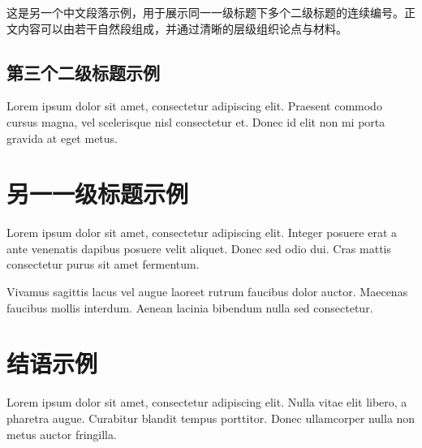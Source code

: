 \documentclass[BAhumanities,customization]{main}
\begin{document}
这是另一个中文段落示例，用于展示同一一级标题下多个二级标题的连续编号。正文内容可以由若干自然段组成，并通过清晰的层级组织论点与材料。

\subsection{第三个二级标题示例}

Lorem ipsum dolor sit amet, consectetur adipiscing elit. Praesent commodo cursus magna, vel scelerisque nisl consectetur et. Donec id elit non mi porta gravida at eget metus.

\section{另一一级标题示例}

Lorem ipsum dolor sit amet, consectetur adipiscing elit. Integer posuere erat a ante venenatis dapibus posuere velit aliquet. Donec sed odio dui. Cras mattis consectetur purus sit amet fermentum.

Vivamus sagittis lacus vel augue laoreet rutrum faucibus dolor auctor. Maecenas faucibus mollis interdum. Aenean lacinia bibendum nulla sed consectetur.

\section*{结语示例}

Lorem ipsum dolor sit amet, consectetur adipiscing elit. Nulla vitae elit libero, a pharetra augue. Curabitur blandit tempus porttitor. Donec ullamcorper nulla non metus auctor fringilla.

\clearpage


\clearpage
\hypersetup{pageanchor=false}

\end{document}
